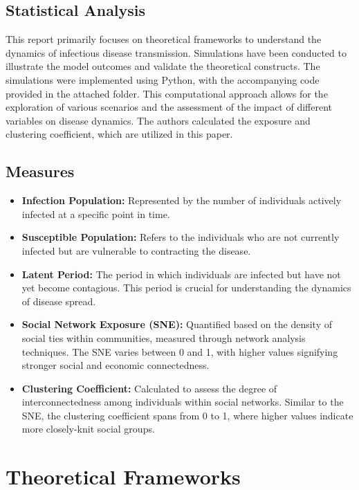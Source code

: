 \documentclass[9 pt]{article} %
\begin{document}
\subsection{Statistical Analysis} This report primarily focuses on theoretical frameworks to understand the dynamics of infectious disease transmission. Simulations have been conducted to illustrate the model outcomes and validate the theoretical constructs. The simulations were implemented using Python, with the accompanying code provided in the attached folder. This computational approach allows for the exploration of various scenarios and the assessment of the impact of different variables on disease dynamics. The authors calculated the exposure and clustering coefficient, which are utilized in this paper.

\subsection{Measures}

\begin{itemize}
    \item \textbf{Infection Population:} Represented by the number of individuals actively infected at a specific point in time.
    
    \item \textbf{Susceptible Population:} Refers to the individuals who are not currently infected but are vulnerable to contracting the disease.
    
    \item \textbf{Latent Period:} The period in which individuals are infected but have not yet become contagious. This period is crucial for understanding the dynamics of disease spread.
    
    \item \textbf{Social Network Exposure (SNE):} Quantified based on the density of social ties within communities, measured through network analysis techniques. The SNE varies between 0 and 1, with higher values signifying stronger social and economic connectedness.
    
    \item \textbf{Clustering Coefficient:} Calculated to assess the degree of interconnectedness among individuals within social networks. Similar to the SNE, the clustering coefficient spans from 0 to 1, where higher values indicate more closely-knit social groups.
\end{itemize}

\section{Theoretical Frameworks}
\end{document}
